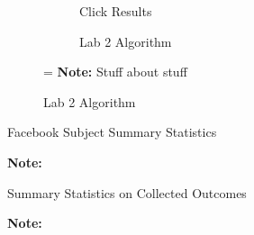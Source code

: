 \documentclass[12pt,letterpaper]{article}
\begin{document}
\begin{figure}[ht]
\caption{Lab Experiment 2 Results}
\label{fig:lab2}
    \begin{subfigure}{.5\textwidth} 
        \centering
        \caption{Click Results}
        \label{fig:lab2_click}
        \end{subfigure}
    \begin{subfigure}{.5\textwidth}
       \centering
        \caption{Lab 2 Algorithm}
         \label{fig:lab2_algo}
    \end{subfigure}
=
\footnotesize \textbf{Note:} Stuff about stuff
\end{figure}



\begin{table}[]
    \caption{Facebook Subject Summary Statistics}
    \begin{center}
    
    \label{tab:sumstats_p}
    \end{center}
\footnotesize \textbf{Note:} 
\end{table}

%

%


\begin{table}[]
\caption{Summary Statistics on Collected Outcomes}
    \begin{center}
    
    \label{tab:sumstats_o}
    \end{center}
\footnotesize \textbf{Note:} 
\end{table}

\end{document}
